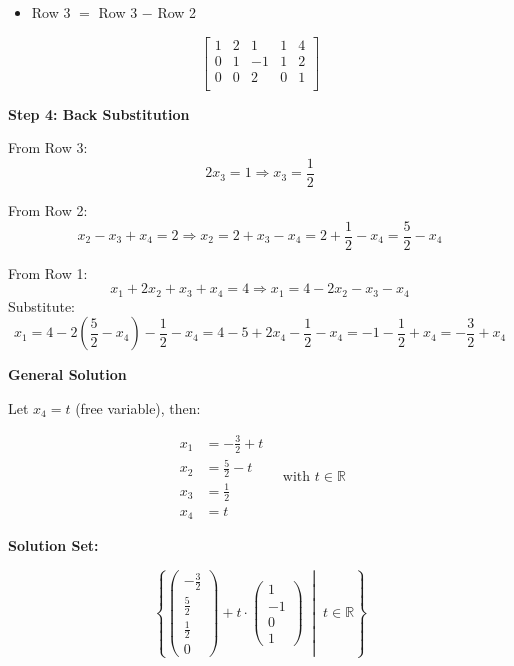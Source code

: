 \begin{itemize}[label=\(-\)]
	\item Row 3 \(=\) Row 3 \(-\) Row 2
\end{itemize}

\[
	\begin{bmatrix}
		1 & 2 & 1  & 1 & 4 \\
		0 & 1 & -1 & 1 & 2 \\
		0 & 0 & 2  & 0 & 1 \\
	\end{bmatrix}
\]

\textbf{Step 4: Back Substitution}
\vspace{\baselineskip}

From Row 3:
\[
	2x_3 = 1 \Rightarrow x_3 = \frac{1}{2}
\]

From Row 2:
\[
	x_2 - x_3 + x_4 = 2 \Rightarrow x_2 = 2 + x_3 - x_4 = 2 + \frac{1}{2} - x_4 = \frac{5}{2} - x_4
\]

From Row 1:
\[
	x_1 + 2x_2 + x_3 + x_4 = 4
	\Rightarrow x_1 = 4 - 2x_2 - x_3 - x_4
\]
Substitute:
\[
	x_1 = 4 - 2\left( \frac{5}{2} - x_4 \right) - \frac{1}{2} - x_4
	= 4 - 5 + 2x_4 - \frac{1}{2} - x_4
	= -1 - \frac{1}{2} + x_4 = -\frac{3}{2} + x_4
\]

\textbf{General Solution}
\vspace{\baselineskip}

Let \(x_4 = t\) (free variable), then:

\[
	\begin{aligned}
		x_1 & = -\frac{3}{2} + t \\
		x_2 & = \frac{5}{2} - t  \\
		x_3 & = \frac{1}{2}      \\
		x_4 & = t
	\end{aligned}
	\quad \text{with } t \in \mathbb{R}
\]

\textbf{Solution Set:}

\[
	\left\{
	\begin{pmatrix}
		-\frac{3}{2} \\ \frac{5}{2} \\ \frac{1}{2} \\ 0
	\end{pmatrix}
	+ t \cdot
	\begin{pmatrix}
		1 \\ -1 \\ 0 \\ 1
	\end{pmatrix}
	\;\middle|\; t \in \mathbb{R}
	\right\}
\]


